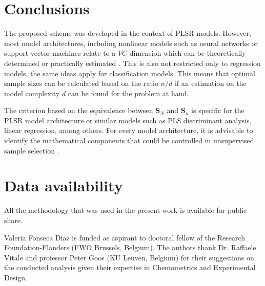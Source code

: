 \documentclass[journal=ancham,manuscript=article]{achemso}
\begin{document}

\section*{Conclusions}\label{conclusions}

The proposed scheme was developed in the context of PLSR models. However, most model architectures, including nonlinear models such as neural networks or support vector machines relate to a $VC$ dimension which can be theoretically determined or practically estimated \cite{Vapnik2019, Vapnik1994}. This is also not restricted only to regression models, the same ideas apply for classification models. This means that optimal sample sizes can be calculated based on the ratio $n/d$ if an estimation on the model complexity $d$ can be found for the problem at hand. 

The criterion based on the equivalence between $\mathbf{S}_N$ and $\mathbf{S}_n$ is specific for the PLSR model architecture or similar models such as PLS discriminant analysis, linear regression, among others. For every model architecture, it is advisable to identify the mathematical components that could be controlled in unsupervised sample selection \cite{Li2020}.  





\section{Data availability}

All the methodology that was used in the present work is available for public share. 


\begin{acknowledgement}

Valeria Fonseca Diaz is funded as aspirant to doctoral fellow of
the Research Foundation-Flanders (FWO Brussels, Belgium).
The authors thank Dr. Raffaele Vitale and professor Peter Goos (KU Leuven, Belgium) for their suggestions on the conducted analysis given their expertise in Chemometrics and Experimental Design. 
\end{acknowledgement}





\end{document}
